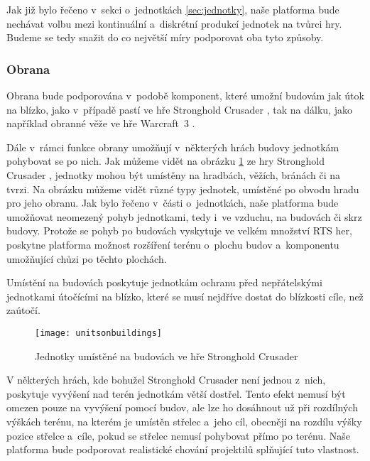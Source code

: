Jak již bylo řečeno v~sekci o~jednotkách \ref{sec:jednotky}, naše platforma bude nechávat volbu mezi kontinuální a~diskrétní produkcí jednotek na tvůrci hry. Budeme se tedy snažit do co největší míry podporovat oba tyto způsoby. 

\subsubsection{Obrana}

Obrana bude podporována v~podobě komponent, které umožní budovám jak útok na blízko, jako v~případě pastí ve hře Stronghold Crusader \citep{site:strongholdcrus}, tak na dálku, jako například obranné věže ve hře Warcraft~3 \citep{site:warcraft3}. 

Dále v~rámci funkce obrany umožňují v~některých hrách budovy jednotkám pohybovat se po nich. Jak můžeme vidět na obrázku \ref{fig:unitsonbuildings} ze hry Stronghold Crusader \citep{site:strongholdcrus}, jednotky mohou být umístěny na hradbách, věžích, bránách či na tvrzi. Na obrázku můžeme vidět různé typy jednotek, umístěné po obvodu hradu pro jeho obranu. Jak bylo řečeno v~části o~jednotkách, naše platforma bude umožňovat neomezený pohyb jednotkami, tedy i~ve vzduchu, na budovách či skrz budovy. Protože se pohyb po budovách vyskytuje ve velkém množství RTS her, poskytne platforma možnost rozšíření terénu o~plochu budov a~komponentu umožňující chůzi po těchto plochách.

Umístění na budovách poskytuje jednotkám ochranu před nepřátelskými jednotkami útočícími na blízko, které se musí nejdříve dostat do blízkosti cíle, než zaútočí. 

\begin{figure}[h]	
	\centering
	\texttt{[image: unitsonbuildings]}
	\caption{Jednotky umístěné na budovách ve hře Stronghold Crusader \citep{site:strongholdcrus}}
	\label{fig:unitsonbuildings}
\end{figure}

V některých hrách, kde bohužel Stronghold Crusader \citep{site:strongholdcrus} není jednou z~nich, poskytuje vyvýšení nad terén jednotkám větší dostřel. Tento efekt nemusí být omezen pouze na vyvýšení pomocí budov, ale lze ho dosáhnout už při rozdílných výškách terénu, na kterém je umístěn střelec a~jeho cíl, obecněji na rozdílu výšky pozice střelce a~cíle, pokud se střelec nemusí pohybovat přímo po terénu. Naše platforma bude podporovat realistické chování projektilů splňující tuto vlastnost. 

\done
{}
\done
{}

